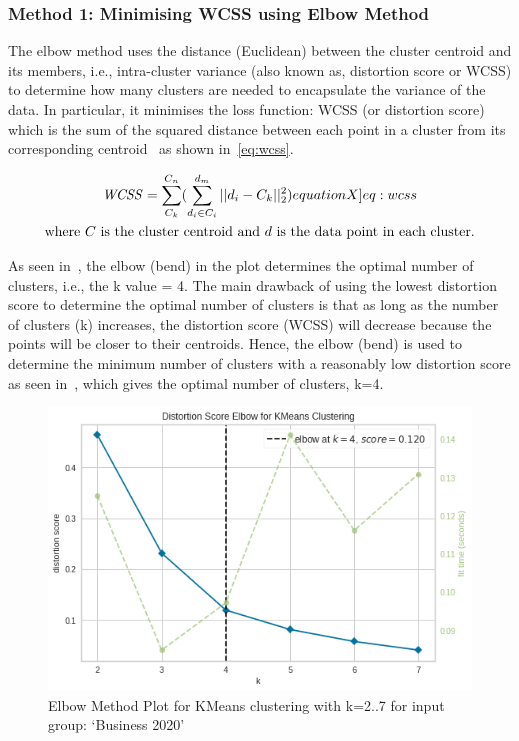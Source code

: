 \subsubsection{Method 1: Minimising WCSS using Elbow Method}
The elbow method uses the distance (Euclidean) between the cluster centroid and its members, i.e., intra-cluster variance (also known as, distortion score or WCSS) to determine how many clusters are needed to encapsulate the variance of the data. In particular, it minimises the loss function: WCSS (or distortion score) which is the sum of the squared distance between each point in a cluster from its corresponding centroid~\cite{elbowvssil} as shown in~\ref{eq:wcss}.

\vspace{-2ex}
\begin{gather}
  \mathit{WCSS} =  \sum^{C_n}_{C_k} (\sum^{d_m}_{d_i \in C_i} || d_i - C_k ||_2^2) \label[equationX]{eq:wcss} \\
  \text{where~$C$ is the cluster centroid and~$d$ is the data point in each cluster.} \nonumber
\end{gather}

As seen in~, the elbow (bend) in the plot determines the optimal number of clusters, i.e., the k value = 4. The main drawback of using the lowest distortion score to determine the optimal number of clusters is that as long as the number of clusters (k) increases, the distortion score (WCSS) will decrease because the points will be closer to their centroids. Hence, the elbow (bend) is used to determine the minimum number of clusters with a reasonably low distortion score as seen in~, which gives the optimal number of clusters, k=4.

\begin{figure}[H]
\centering
\includegraphics[scale=0.4]{images/elbow.png}
\caption{Elbow Method Plot for KMeans clustering with k=2..7 for input group: `Business 2020' }
\label{fig:elbow}
\end{figure}

